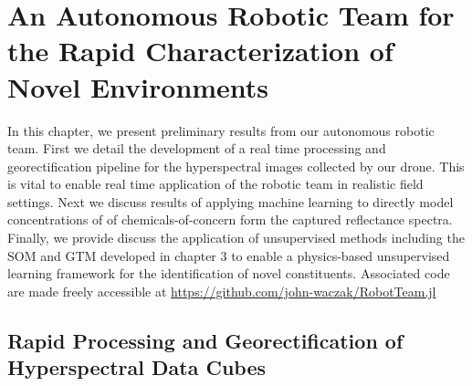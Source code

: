 \chapter{An Autonomous Robotic Team for the Rapid Characterization of Novel Environments}

In this chapter, we present preliminary results from our autonomous robotic team. First we detail the development of a real time processing and georectification pipeline for the hyperspectral images collected by our drone. This is vital to enable real time application of the robotic team in realistic field settings. Next we discuss results of applying machine learning to directly model concentrations of of chemicals-of-concern form the captured reflectance spectra. Finally, we provide discuss the application of unsupervised methods including the SOM and GTM developed in chapter 3 to enable a physics-based unsupervised learning framework for the identification of novel constituents. Associated code are made freely accessible at \url{https://github.com/john-waczak/RobotTeam.jl}

\section{Rapid Processing and Georectification of Hyperspectral Data Cubes}


